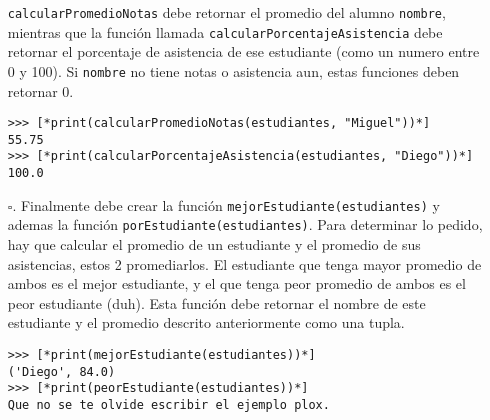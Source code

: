 \begin{enumerate}
    \texttt{calcularPromedioNotas} debe retornar el promedio del alumno \texttt{nombre}, mientras que la función llamada \texttt{calcularPorcentajeAsistencia} debe retornar el porcentaje de asistencia de ese estudiante (como un numero entre 0 y 100). Si \texttt{nombre} no tiene notas o asistencia aun, estas funciones deben retornar 0.

\begin{lstlisting}[style=consola]
>>> [*print(calcularPromedioNotas(estudiantes, "Miguel"))*]
55.75
>>> [*print(calcularPorcentajeAsistencia(estudiantes, "Diego"))*]
100.0
\end{lstlisting}

    \item[$\square$.] Finalmente debe crear la función \texttt{mejorEstudiante(estudiantes)} y ademas la función \newline \texttt{porEstudiante(estudiantes)}. Para determinar lo pedido, hay que calcular el promedio de un estudiante y el promedio de sus asistencias, estos 2 promediarlos. El estudiante que tenga mayor promedio de ambos es el mejor estudiante, y el que tenga peor promedio de ambos es el peor estudiante (duh). Esta función debe retornar el nombre de este estudiante y el promedio descrito anteriormente como una tupla.

\begin{lstlisting}[style=consola]
>>> [*print(mejorEstudiante(estudiantes))*]
('Diego', 84.0)
>>> [*print(peorEstudiante(estudiantes))*]
Que no se te olvide escribir el ejemplo plox.
\end{lstlisting}

\end{enumerate}
